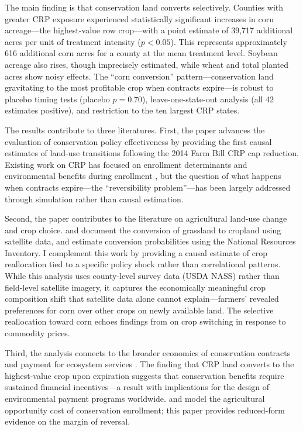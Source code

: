 \documentclass[12pt]{article}
\begin{document}
The main finding is that conservation land converts selectively. Counties with greater CRP exposure experienced statistically significant increases in corn acreage---the highest-value row crop---with a point estimate of 39,717 additional acres per unit of treatment intensity ($p < 0.05$). This represents approximately 616 additional corn acres for a county at the mean treatment level. Soybean acreage also rises, though imprecisely estimated, while wheat and total planted acres show noisy effects. The ``corn conversion'' pattern---conservation land gravitating to the most profitable crop when contracts expire---is robust to placebo timing tests (placebo $p = 0.70$), leave-one-state-out analysis (all 42 estimates positive), and restriction to the ten largest CRP states.

The results contribute to three literatures. First, the paper advances the evaluation of conservation policy effectiveness by providing the first causal estimates of land-use transitions following the 2014 Farm Bill CRP cap reduction. Existing work on CRP has focused on enrollment determinants \citep{sullivan2004design, hellerstein2017national} and environmental benefits during enrollment \citep{morefield2016grasslands, johnson2016agricultural}, but the question of what happens when contracts expire---the ``reversibility problem''---has been largely addressed through simulation \citep{claassen2011grassland} rather than causal estimation.

Second, the paper contributes to the literature on agricultural land-use change and crop choice. \citet{lark2015cropland} and \citet{wright2017recent} document the conversion of grassland to cropland using satellite data, and \citet{hendricks2014potential} estimate conversion probabilities using the National Resources Inventory. I complement this work by providing a causal estimate of crop reallocation tied to a specific policy shock rather than correlational patterns. While this analysis uses county-level survey data (USDA NASS) rather than field-level satellite imagery, it captures the economically meaningful crop composition shift that satellite data alone cannot explain---farmers' revealed preferences for corn over other crops on newly available land. The selective reallocation toward corn echoes findings from \citet{roberts2013role} on crop switching in response to commodity prices.

Third, the analysis connects to the broader economics of conservation contracts and payment for ecosystem services \citep{ferraro2011future, jayachandran2017cash}. The finding that CRP land converts to the highest-value crop upon expiration suggests that conservation benefits require sustained financial incentives---a result with implications for the design of environmental payment programs worldwide. \citet{wu1999crop} and \citet{plantinga1999determinants} model the agricultural opportunity cost of conservation enrollment; this paper provides reduced-form evidence on the margin of reversal.
\end{document}
